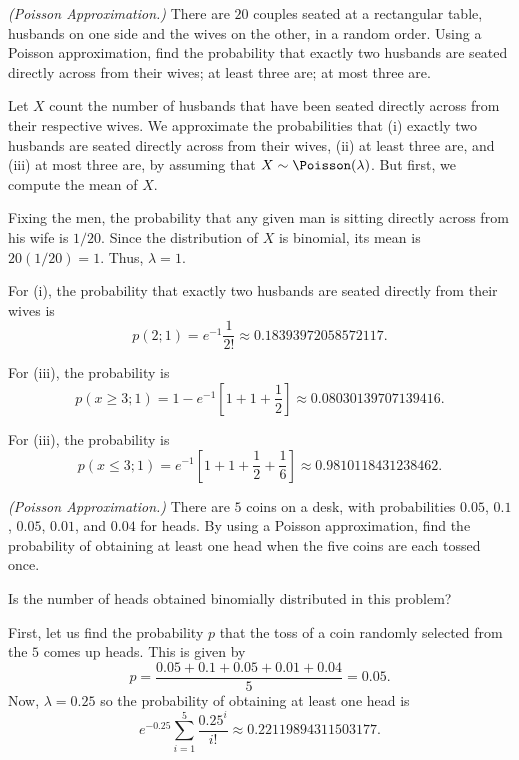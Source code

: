 \begin{problem}[Handout 10, \# 6]
  \emph{(Poisson Approximation.)} There are \(20\) couples seated at a
  rectangular table, husbands on one side and the wives on the other, in a
  random order. Using a Poisson approximation, find the probability that
  exactly two husbands are seated directly across from their wives; at
  least three are; at most three are.
\end{problem}
\begin{solution}
  Let \(X\) count the number of husbands that have been seated directly
  across from their respective wives. We approximate the probabilities that
  (i) exactly two husbands are seated directly across from their wives,
  (ii) at least three are, and (iii) at most three are, by assuming that
  \(X\sim\Poisson(\lambda)\). But first, we compute the mean of \(X\).

  Fixing the men, the probability that any given man is sitting directly
  across from his wife is \(1/20\). Since the distribution of \(X\) is
  binomial, its mean is \(20(1/20)=1\). Thus, \(\lambda=1\).

  For (i), the probability that exactly two husbands are seated directly
  from their wives is
  \[
    p(2;1)=e^{-1}\frac{1}{2!}\approx\num{0.18393972058572117}.
  \]

  For (iii), the probability is
  \[
    p(x\geq
    3;1)=1-e^{-1}\left[1+1+\frac{1}{2}\right]\approx\num{0.08030139707139416}.
  \]

  For (iii), the probability is
  \[
    p(x\leq 3;1)=
    e^{-1}\left[1+1+\frac{1}{2}+\frac{1}{6}\right]\approx\num{0.9810118431238462}.
  \]
\end{solution}
\newpage

\begin{problem}[Handout 10, \# 7]
  \emph{(Poisson Approximation.)} There are \(5\) coins on a desk, with
  probabilities \(0.05\), \(0.1\), \(0.05\), \(0.01\), and \(0.04\) for
  heads. By using a Poisson approximation, find the probability of
  obtaining at least one head when the five coins are each tossed once.

  \noindent Is the number of heads obtained binomially distributed in this
  problem?
\end{problem}
\begin{solution}
  First, let us find the probability \(p\) that the toss of a coin randomly
  selected from the \(5\) comes up heads. This is given by
  \[
    p=\frac{0.05+0.1+0.05+0.01+0.04}{5}=0.05.
  \]
  Now, \(\lambda=0.25\) so the probability of obtaining at least one head
  is
  \[
    e^{-0.25}\sum_{i=1}^5 \frac{0.25^i}{i!}\approx\num{0.22119894311503177}.
  \]
\end{solution}
\newpage

